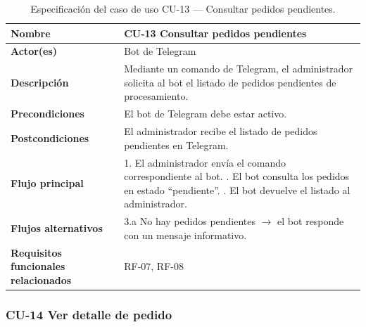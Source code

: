 \begin{table}[H]
\centering
\small
\begin{tabular}{|m{}|m{}|}
\hline
\textbf{Nombre} & CU-13 Consultar pedidos pendientes \\ \hline
\textbf{Actor(es)} & Bot de Telegram \\ \hline
\textbf{Descripción} & Mediante un comando de Telegram, el administrador solicita al bot el listado de pedidos pendientes de procesamiento. \\ \hline
\textbf{Precondiciones} & El bot de Telegram debe estar activo. \\ \hline
\textbf{Postcondiciones} & El administrador recibe el listado de pedidos pendientes en Telegram. \\ \hline
\textbf{Flujo principal} & 1. El administrador envía el comando correspondiente al bot. \newline 2. El bot consulta los pedidos en estado ``pendiente''. \newline 3. El bot devuelve el listado al administrador. \\ \hline
\textbf{Flujos alternativos} & 3.a No hay pedidos pendientes $\rightarrow$ el bot responde con un mensaje informativo. \\ \hline
\textbf{Requisitos funcionales relacionados} & RF-07, RF-08 \\ \hline
\end{tabular}
\caption{Especificación del caso de uso CU-13 — Consultar pedidos pendientes.}
\end{table}

\subsubsection{CU-14 Ver detalle de pedido}

